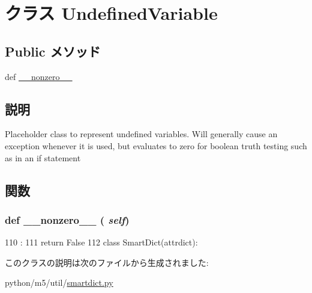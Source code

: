 \hypertarget{classm5_1_1util_1_1smartdict_1_1UndefinedVariable}{
\section{クラス UndefinedVariable}
\label{classm5_1_1util_1_1smartdict_1_1UndefinedVariable}
}
\subsection*{Public メソッド}
\begin{DoxyCompactItemize}
\item 
def \hyperlink{classm5_1_1util_1_1smartdict_1_1UndefinedVariable_a14f4a7f4cbfde7254adc73da3b2de9a5}{\_\-\_\-nonzero\_\-\_\-}
\end{DoxyCompactItemize}


\subsection{説明}
\begin{DoxyVerb}Placeholder class to represent undefined variables.  Will
generally cause an exception whenever it is used, but evaluates to
zero for boolean truth testing such as in an if statement\end{DoxyVerb}
 

\subsection{関数}
\hypertarget{classm5_1_1util_1_1smartdict_1_1UndefinedVariable_a14f4a7f4cbfde7254adc73da3b2de9a5}{
\subsubsection[{\_\-\_\-nonzero\_\-\_\-}]{\setlength{\rightskip}{0pt plus 5cm}def \_\-\_\-nonzero\_\-\_\- ( {\em self})}}
\label{classm5_1_1util_1_1smartdict_1_1UndefinedVariable_a14f4a7f4cbfde7254adc73da3b2de9a5}



\begin{DoxyCode}
110                          :
111         return False
112 
class SmartDict(attrdict):
\end{DoxyCode}


このクラスの説明は次のファイルから生成されました:\begin{DoxyCompactItemize}
\item 
python/m5/util/\hyperlink{smartdict_8py}{smartdict.py}\end{DoxyCompactItemize}
